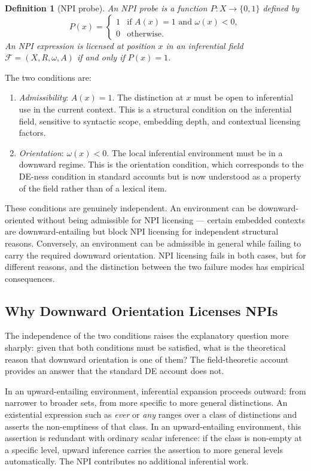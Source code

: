 \documentclass[12pt]{article}
\newtheorem{definition}[theorem]{Definition}
\theoremstyle{remark}
\begin{document}
\begin{definition}[NPI probe]
An \emph{NPI probe} is a function $P : X \to \{0, 1\}$ defined by
\[
P(x) = \begin{cases} 1 & \text{if } A(x) = 1 \text{ and } \omega(x) <
0, \\ 0 & \text{otherwise.} \end{cases}
\]
An NPI expression is licensed at position $x$ in an inferential field
$\mathcal{F} = (X, R, \omega, A)$ if and only if $P(x) = 1$.
\end{definition}
The two conditions are:
\begin{enumerate}
\item[(i)] \emph{Admissibility}: $A(x) = 1$. The distinction at $x$ must
be open to inferential use in the current context. This is a structural
condition on the inferential field, sensitive to syntactic scope,
embedding depth, and contextual licensing factors.
\item[(ii)] \emph{Orientation}: $\omega(x) < 0$. The local inferential
environment must be in a downward regime. This is the orientation
condition, which corresponds to the DE-ness condition in standard
accounts but is now understood as a property of the field rather than
of a lexical item.
\end{enumerate}

These conditions are genuinely independent. An environment can be
downward-oriented without being admissible for NPI licensing --- certain
embedded contexts are downward-entailing but block NPI licensing for
independent structural reasons. Conversely, an environment can be
admissible in general while failing to carry the required downward
orientation. NPI licensing fails in both cases, but for different
reasons, and the distinction between the two failure modes has empirical
consequences.

\subsection{Why Downward Orientation Licenses NPIs}

The independence of the two conditions raises the explanatory question
more sharply: given that both conditions must be satisfied, what is the
theoretical reason that downward orientation is one of them? The
field-theoretic account provides an answer that the standard DE account
does not.

In an upward-entailing environment, inferential expansion proceeds
outward: from narrower to broader sets, from more specific to more
general distinctions. An existential expression such as \emph{ever} or
\emph{any} ranges over a class of distinctions and asserts the
non-emptiness of that class. In an upward-entailing environment, this
assertion is redundant with ordinary scalar inference: if the class is
non-empty at a specific level, upward inference carries the assertion to
more general levels automatically. The NPI contributes no additional
inferential work.
\end{document}

